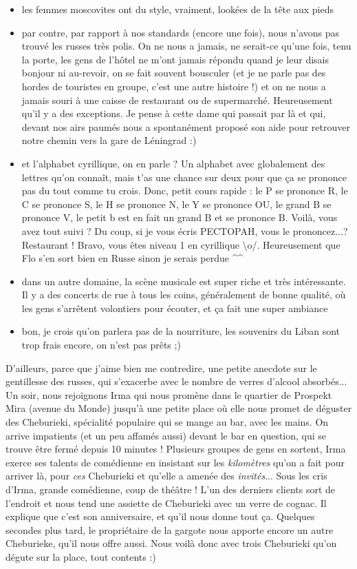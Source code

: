 \begin{itemize}
\tightlist
\item
  les femmes moscovites ont du style, vraiment, lookées de la tête aux
  pieds
\item
  par contre, par rapport à nos standards (encore une fois), nous
  n'avons pas trouvé les russes très polis. On ne nous a jamais, ne
  serait-ce qu'une fois, tenu la porte, les gens de l'hôtel ne m'ont
  jamais répondu quand je leur disais bonjour ni au-revoir, on se fait
  souvent bousculer (et je ne parle pas des hordes de touristes en
  groupe, c'est une autre histoire !) et on ne nous a jamais souri à une
  caisse de restaurant ou de supermarché. Heureusement qu'il y a des
  exceptions. Je pense à cette dame qui passait par là et qui, devant
  nos airs paumés nous a spontanément proposé son aide pour retrouver
  notre chemin vers la gare de Léningrad :)
\item
  et l'alphabet cyrillique, on en parle ? Un alphabet avec globalement
  des lettres qu'on connaît, mais t'as une chance sur deux pour que ça
  se prononce pas du tout comme tu crois. Donc, petit cours rapide : le
  P se prononce R, le C se prononce S, le H se prononce N, le Y se
  prononce OU, le grand B se prononce V, le petit b est en fait un grand
  B et se prononce B. Voilà, vous avez tout suivi ? Du coup, si je vous
  écris PECTOPAH, vous le prononcez...? Restaurant ! Bravo, vous êtes
  niveau 1 en cyrillique \textbackslash{}o/. Heureusement que Flo s'en
  sort bien en Russe sinon je serais perdue \^{}\^{}
\item
  dans un autre domaine, la scène musicale est super riche et très
  intéressante. Il y a des concerts de rue à tous les coins,
  généralement de bonne qualité, où les gens s'arrêtent volontiers pour
  écouter, et ça fait une super ambiance
\item
  bon, je crois qu'on parlera pas de la nourriture, les souvenirs du
  Liban sont trop frais encore, on n'est pas prêts ;)
\end{itemize}

D'ailleurs, parce que j'aime bien me contredire, une petite anecdote sur
le gentillesse des russes, qui s'exacerbe avec le nombre de verres
d'alcool absorbés... Un soir, nous rejoignons Irma qui nous promène dans
le quartier de Prospekt Mira (avenue du Monde) jusqu'à une petite place
où elle nous promet de déguster des Cheburieki, spécialité populaire qui
se mange au bar, avec les mains. On arrive impatients (et un peu affamés
aussi) devant le bar en question, qui se trouve être fermé depuis 10
minutes ! Plusieurs groupes de gens en sortent, Irma exerce ses talents
de comédienne en insistant sur les \emph{kilomètres} qu'on a fait pour
arriver là, pour \emph{ces} Cheburieki et qu'elle a amenée des
\emph{invités}... Sous les cris d'Irma, grande comédienne, coup de
théâtre ! L'un des derniers clients sort de l'endroit et nous tend une
assiette de Cheburieki avec un verre de cognac. Il explique que c'est
son anniversaire, et qu'il nous donne tout ça. Quelques secondes plus
tard, le propriétaire de la gargote nous apporte encore un autre
Cheburieke, qu'il nous offre aussi. Nous voilà donc avec trois
Cheburieki qu'on dégute sur la place, tout contents :)

